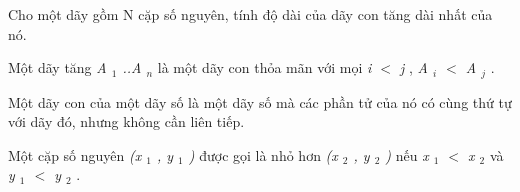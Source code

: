 Cho một dãy gồm       N      cặp số nguyên, tính độ dài của       dãy con tăng dài nhất      của nó.  

   Một       dãy tăng      \textit{    A    $_     1    $    ..A    $_     n    $}   là một dãy con thỏa mãn với mọi   \textit{    i $<$ j   }   ,   \textit{    A    $_     i    $    $<$ A    $_     j    $}   .  

   Một       dãy con      của một dãy số là một dãy số mà các phần tử của nó có cùng thứ tự với dãy đó, nhưng không cần liên tiếp.  

   Một cặp số nguyên   \textit{    (x    $_     1    $    , y    $_     1    $    )   }   được gọi là nhỏ hơn   \textit{    (x    $_     2    $    , y    $_     2    $    )   }       nếu      \textit{    x    $_     1    $    $<$ x    $_     2    $}   và   \textit{    y    $_     1    $    $<$ y    $_     2    $}   .